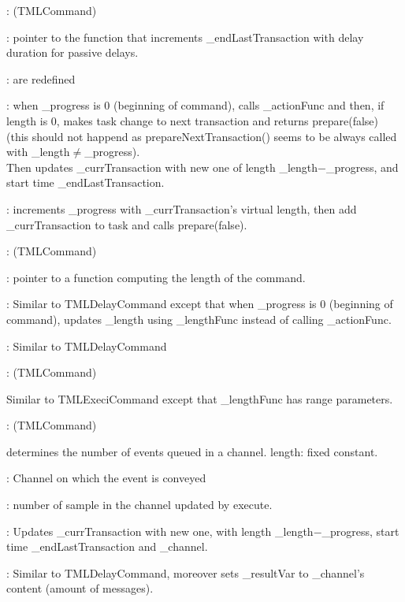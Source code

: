 \documentclass[a4paper,11pt]{article}
\newcommand{\bfont}{\fontseries{b}\selectfont}
\newcommand{\cod}[1]{{\ttfamily #1}}
\newcommand{\class}[2]{\par\vspace{1mm}\hspace{-5mm}\large\colorbox{file}{\textbullet\bfont\cod{#1}:} (\cod{#2})\par}
\newcommand{\method}[1]{\par\vspace{1mm}\hspace{-2mm}\colorbox{method}{\textopenbullet\bfont\cod{#1}:}}
\newcommand{\variable}[1]{\par\vspace{1mm}\hspace{-2mm}\colorbox{variable}{\textopenbullet\bfont\cod{#1}:}}
\begin{document}
\class{TMLDelayCommand}{TMLCommand}
\variable{\_actionFunc} pointer to the function that increments \cod{\_endLastTransaction} with delay duration for passive delays.
\method{getActiveDelay(), isDelayTransaction()} are redefined
\method{prepareNextTransaction()} when \cod{\_progress} is 0 (beginning of command), calls \cod{\_ac\-tionFunc} and then, if \cod{length} is 0, makes task change to next transaction and returns \cod{prepare(false)} (this should not happend as \cod{prepareNextTransaction()} seems to be always called with \cod{\_length}$\neq$\cod{\_progress}).\\ Then updates \cod{\_currTransaction} with new one of length \cod{\_length}$-$\cod{\_progress}, and start time \cod{\_endLastTransaction}.
\method{execute()} increments \cod{\_progress} with \cod{\_currTransaction}'s virtual length, then add \cod{\_curr\-Transaction} to task and calls \cod{prepare(false)}.

\class{TMLExeciCommand}{TMLCommand}
\variable{\_lengthFunc} pointer to a function computing the length of the command.
\method{prepareNextTransaction()} Similar to \cod{TMLDelayCommand} except that when \cod{\_prog\-ress} is 0 (beginning of command), updates \cod{\_length} using \cod{\_lengthFunc} instead of calling \cod{\_actionFunc}.
\method{execute()} Similar to \cod{TMLDelayCommand}

\class{TMLExeciRangeCommand}{TMLCommand}
Similar to \cod{TMLExeciCommand} except that \cod{\_lengthFunc} has range parameters.

\class{TMLNotifiedCommand}{TMLCommand}
determines the number of events queued in a channel. length: fixed constant.
\variable{\_channel} Channel on which the event is conveyed
\variable{\_resultVar} number of sample in the channel updated by \cod{execute}.
\method{prepareNextTransaction()} Updates \cod{\_currTransaction} with new one, with length \cod{\_length}$-$\cod{\_progress}, start time \cod{\_endLastTransaction} and \cod{\_channel}.
\method{execute()} Similar to \cod{TMLDelayCommand}, moreover sets \cod{\_resultVar} to \cod{\_channel}'s content (amount of messages).
\end{document}
